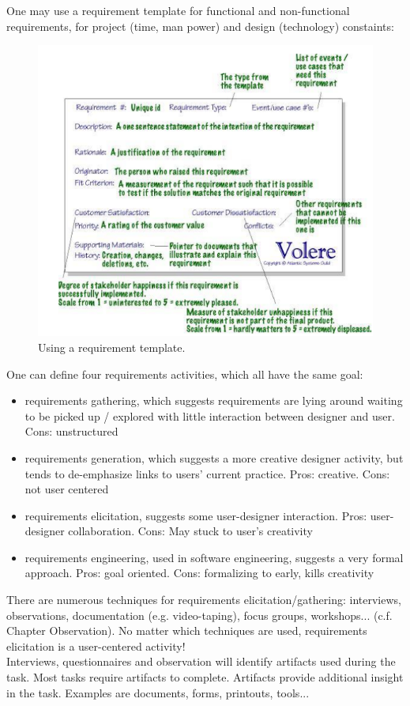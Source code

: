One may use a requirement template for functional and non-functional requirements, for project (time, man power) and design (technology) constaints:
\begin{figure}[h!]
	\centering
	\includegraphics[width=.8\textwidth]{img/ch06_req.png}
	\caption{Using a requirement template.}
	\label{req}
\end{figure}
One can define four requirements activities, which all have the same goal:
\begin{itemize}
\item requirements gathering, which suggests requirements are lying around waiting to be picked up / explored with little interaction between designer and user. Cons: unstructured
\item requirements generation, which suggests a more creative designer activity, but tends to de-emphasize links to users' current practice.
Pros: creative. Cons: not user centered
\item requirements elicitation, suggests some user-designer interaction. Pros: user-designer collaboration. Cons: May stuck to user's creativity
\item requirements engineering, used in software engineering, suggests a very formal approach. Pros: goal oriented. Cons: formalizing to early, kills creativity
\end{itemize}
There are numerous techniques for requirements elicitation/gathering: interviews, observations, documentation (e.g. video-taping), focus groups, workshops... (c.f. Chapter Observation). No matter which techniques are used, requirements elicitation is a user-centered activity!\\
Interviews, questionnaires and observation will identify artifacts used during the task. Most tasks require artifacts to complete. Artifacts provide additional insight in the task. Examples are documents, forms, printouts, tools...

